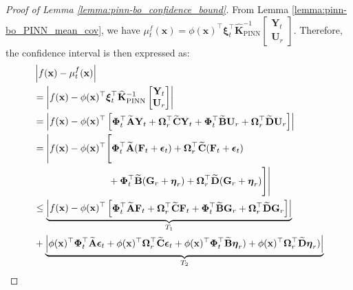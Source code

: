 \begin{proof}[Proof of Lemma \ref{lemma:pinn-bo_confidence_bound}]
From Lemma \ref{lemma:pinn-bo_PINN_mean_cov}, we have $\mu_t^f(\mathbf{x}) =\phi(\mathbf{x})^\top \boldsymbol{\xi}_t^\top \mathbf{\widehat{K}}_\mathrm{PINN}^{-1} \begin{bmatrix}
         \mathbf{Y}_t \\
         \mathbf{U}_r\end{bmatrix}$. Therefore, the confidence interval is then expressed as:
\begin{align*}
        & \left\lvert f(\mathbf{x}) - \mu_t^f(\mathbf{x}) \right\rvert 
        \\
        &= \left\lvert f(\mathbf{x}) - 
        \phi(\mathbf{x})^\top \boldsymbol{\xi}_t^\top \mathbf{\widehat{K}}_\mathrm{PINN}^{-1} \begin{bmatrix}
         \mathbf{Y}_t 
\\
         \mathbf{U}_r\end{bmatrix} \right \rvert
\\
        & = \left\lvert f(\mathbf{x}) - \phi(\mathbf{x})^\top \begin{bmatrix}
            \boldsymbol{\Phi}_t^\top \widetilde{\mathbf{A}}\mathbf{Y}_t + \boldsymbol{\Omega}_r^\top \widetilde{\mathbf{C}}\mathbf{Y}_t + \boldsymbol{\Phi}_t^\top \widetilde{\mathbf{B}}\mathbf{U}_r + \boldsymbol{\Omega}_r^\top \widetilde{\mathbf{D}}\mathbf{U}_r
        \end{bmatrix} \right\rvert 
\\
        & = \Bigg\lvert f(\mathbf{x}) - \phi(\mathbf{x})^\top \Bigg[
            \boldsymbol{\Phi}_t^\top \widetilde{\mathbf{A}}(\mathbf{F}_t + \boldsymbol{\epsilon}_t) + \boldsymbol{\Omega}_r^\top \widetilde{\mathbf{C}}(\mathbf{F}_t + \boldsymbol{\epsilon}_t) \notag \\
            &  \;\;\;\;\;\;\;\;\;\;\;\;\;\;\;\;\;\;\;\;\;\;\;\;\;\;\;\;+  \boldsymbol{\Phi}_t^\top \widetilde{\mathbf{B}}(\mathbf{G}_r +\boldsymbol{\eta}_r) + \boldsymbol{\Omega}_r^\top \widetilde{\mathbf{D}}(\mathbf{G}_r +\boldsymbol{\eta}_r)
        \Bigg] \Bigg\rvert 
\\
        & \le \underbrace{\left\lvert f(\mathbf{x}) - \phi(\mathbf{x})^\top \begin{bmatrix}
            \boldsymbol{\Phi}_t^\top \widetilde{\mathbf{A}}\mathbf{F}_t + \boldsymbol{\Omega}_r^\top \widetilde{\mathbf{C}}\mathbf{F}_t + \boldsymbol{\Phi}_t^\top \widetilde{\mathbf{B}}\mathbf{G}_r+ \boldsymbol{\Omega}_r^\top \widetilde{\mathbf{D}}\mathbf{G}_r
        \end{bmatrix} \right\rvert}_{T_1} 
\\ 
        & + \underbrace{\left\lvert \phi(\mathbf{x})^\top \boldsymbol{\Phi}_t^\top \widetilde{\mathbf{A}}\boldsymbol{\epsilon}_t +  \phi(\mathbf{x})^\top \boldsymbol{\Omega}_r^\top \widetilde{\mathbf{C}}\boldsymbol{\epsilon}_t +  \phi(\mathbf{x})^\top \boldsymbol{\Phi}_t^\top \widetilde{\mathbf{B}}\boldsymbol{\eta}_r) + \phi(\mathbf{x})^\top \boldsymbol{\Omega}_r^\top \widetilde{\mathbf{D}}\boldsymbol{\eta}_r)\right\rvert}_{T_2}
    \end{align*}
    

\end{proof}
